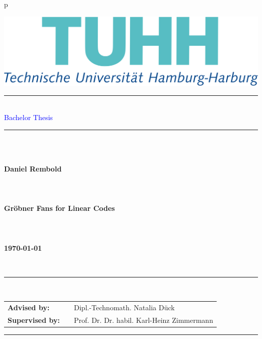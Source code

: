 \begin{tabular}{p{\textwidth}}
\begin{flushright}
\includegraphics[scale=0.15]{figures/tuhh.png}
\end{flushright}


\textcolor{gray}{\rule{15cm}{.8pt}}\\
\vspace{0.01cm}
\LARGE{\textsf{\textcolor{blue}{Bachelor Thesis}}} \\
\textcolor{gray}{\rule{15cm}{.8pt}}

~\\
~\\



\begin{flushright}
\textbf{\LARGE{Daniel Rembold}}
~\\
~\\
~\\
~\\
\textbf{\LARGE{Gröbner Fans for Linear Codes}}
~\\
~\\
~\\
~\\
\textbf{\large{\today}}
\end{flushright}

~\\
\begin{center}
\textcolor{gray}{\rule{15cm}{.8pt}}\\
\begin{tabular}{lll}
\textbf{Advised by:} & & Dipl.-Technomath. Natalia D\"uck \\
\textbf{Supervised by:} & & Prof. Dr. Dr. habil. Karl-Heinz Zimmermann\\
\end{tabular}
\textcolor{gray}{\rule{15cm}{.8pt}}\\
\end{center}

~\\



\end{tabular}
